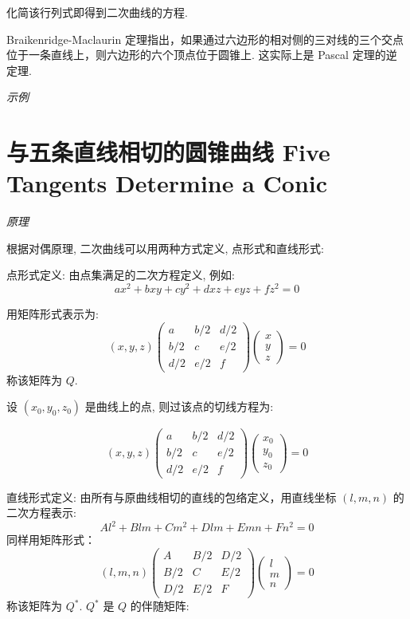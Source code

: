 化简该行列式即得到二次曲线的方程.

Braikenridge-Maclaurin 定理指出，如果通过六边形的相对侧的三对线的三个交点位于一条直线上，则六边形的六个顶点位于圆锥上. 这实际上是 Pascal 定理的逆定理.

\emph{示例}


\section{与五条直线相切的圆锥曲线 Five Tangents Determine a Conic}

\emph{原理}

根据对偶原理, 二次曲线可以用两种方式定义, 点形式和直线形式:

点形式定义: 由点集满足的二次方程定义, 例如:
  \[
  ax^2 + bxy + cy^2 + dxz + eyz + fz^2 = 0
  \]
  
用矩阵形式表示为:
  \[
  (x, y, z) \begin{pmatrix} a & b/2 & d/2 \\ b/2 & c & e/2 \\ d/2 & e/2 & f \end{pmatrix} \begin{pmatrix} x \\ y \\ z \end{pmatrix} = 0
  \]
称该矩阵为 \( Q \).

设 $(x_0,y_0,z_0)$ 是曲线上的点,  则过该点的切线方程为:

\[
  (x,y,z) \begin{pmatrix} a & b/2 & d/2 \\ b/2 & c & e/2 \\ d/2 & e/2 & f \end{pmatrix} \begin{pmatrix} x_0 \\ y_0 \\ z_0 \end{pmatrix} = 0
\]


直线形式定义: 由所有与原曲线相切的直线的包络定义，用直线坐标 \( (l, m, n) \) 的二次方程表示:
  \[
  Al^2 + Blm + Cm^2 + Dlm + Emn + Fn^2 = 0
  \]
同样用矩阵形式：
  \[
  (l, m, n) \begin{pmatrix} A & B/2 & D/2 \\ B/2 & C & E/2 \\ D/2 & E/2 & F \end{pmatrix} \begin{pmatrix} l \\ m \\ n \end{pmatrix} = 0
  \]
称该矩阵为 $Q^*$. $Q^*$ 是 $Q$ 的伴随矩阵:

